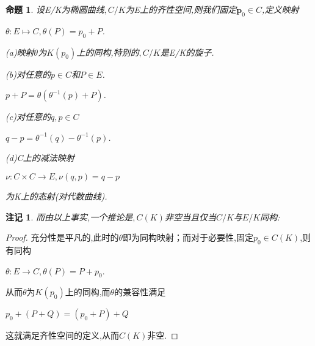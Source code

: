 \documentclass[11pt]{ctexart}
\newcommand{\p}{\mathbf{p}}
\newtheorem{pro}{命题}[section]
\newtheorem{rem}{注记}[section]
\begin{document}
\begin{pro}设E/K为椭圆曲线$,C/K$为E上的齐性空间,则我们固定$\p_0 \in C$,定义映射
\begin{center}
    $\theta :E\mapsto C,\theta(P)=p_0+P$.
\end{center}

(a)映射$\theta$为$K(p_0)$上的同构,特别的$,C/K$是E/K的旋子.

(b)对任意的$p \in C$和$P\in E$.
\begin{center}
    $p+P=\theta (\theta^{-1}(p)+P )$.
\end{center}

(c)对任意的$q,p\in C$
\begin{center}
    $q-p=\theta^{-1}(q) -\theta^{-1}(p) $.
\end{center}

(d)C上的减法映射
\begin{center}
    $\nu:C\times C \rightarrow E,\nu(q,p)=q-p$
\end{center}

为K上的态射(对代数曲线).




\end{pro}

\begin{rem}而由以上事实,一个推论是$,C(K)$非空当且仅当$C/K$与$E/K$同构:
\end{rem}
\begin{proof}
充分性是平凡的,此时的$\theta$即为同构映射；而对于必要性,固定$p_0 \in C(K)$,则有同构
\begin{center}
    $\theta : E \rightarrow C$$,\theta(P)=P+p_0$.
\end{center}
从而$\theta$为$K(p_0)$上的同构,而$\theta$的兼容性满足
\begin{center}
    $p_0+(P+Q)=(p_0+P)+Q$
\end{center}
这就满足齐性空间的定义,从而$C(K)$非空.
\end{proof}
\end{document}
